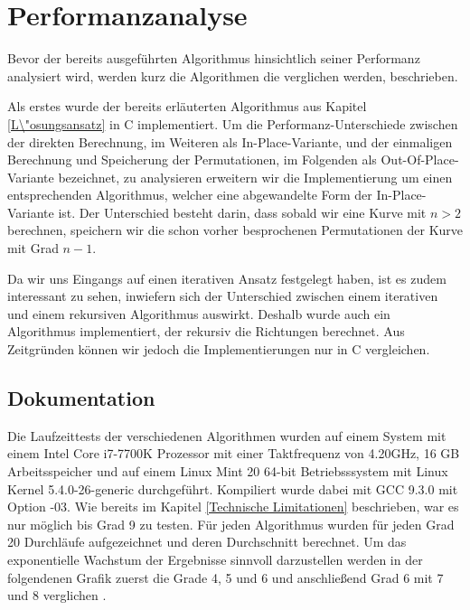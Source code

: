 \documentclass[course=asp]{aspdoc}
\begin{document}
\section{Performanzanalyse} \label{Performanzanalyse}
Bevor der bereits ausgef\"uhrten Algorithmus hinsichtlich seiner Performanz analysiert wird, werden kurz die Algorithmen die verglichen werden, beschrieben.

Als erstes wurde der bereits erl\"auterten Algorithmus aus Kapitel \ref{L\"osungsansatz} in C implementiert. Um die Performanz-Unterschiede zwischen der direkten Berechnung, im Weiteren als In-Place-Variante, und der einmaligen Berechnung und Speicherung der Permutationen, im Folgenden als Out-Of-Place-Variante bezeichnet, zu analysieren erweitern wir die Implementierung um einen entsprechenden Algorithmus, welcher eine abgewandelte Form der In-Place-Variante ist. Der Unterschied besteht darin, dass sobald wir eine Kurve mit $n > 2$ berechnen, speichern wir die schon vorher besprochenen Permutationen der Kurve mit Grad $n - 1$. 

Da wir uns Eingangs auf einen iterativen Ansatz festgelegt haben, ist es zudem interessant zu sehen, inwiefern sich der Unterschied zwischen einem iterativen und einem rekursiven Algorithmus auswirkt. Deshalb wurde auch ein Algorithmus implementiert, der rekursiv die Richtungen berechnet. Aus Zeitgr\"unden k\"onnen wir jedoch die Implementierungen nur in C vergleichen. 

\subsection{Dokumentation}

Die Laufzeittests der verschiedenen Algorithmen wurden auf einem System mit einem Intel Core i7-7700K Prozessor mit einer Taktfrequenz von 4.20GHz, 16 GB Arbeitsspeicher und auf einem Linux Mint 20 64-bit Betriebsssystem mit Linux Kernel 5.4.0-26-generic durchgef\"uhrt. Kompiliert wurde dabei mit GCC 9.3.0 mit Option -03.
Wie bereits im Kapitel \ref{Technische Limitationen} beschrieben, war es nur m\"oglich bis Grad 9 zu testen.
F\"ur jeden Algorithmus wurden f\"ur jeden Grad 20 Durchl\"aufe aufgezeichnet und deren Durchschnitt berechnet. Um das exponentielle Wachstum der Ergebnisse sinnvoll darzustellen werden in der folgendenen Grafik zuerst die Grade 4, 5 und 6 und anschlie\ss end Grad 6 mit 7 und 8 verglichen .
\end{document}
